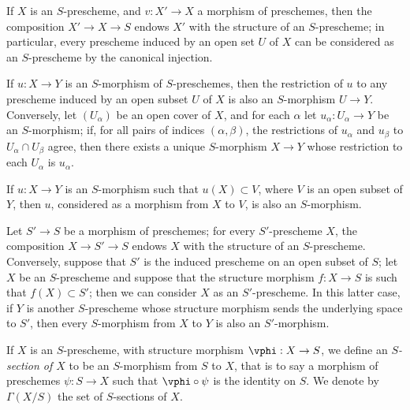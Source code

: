 \begin{env}[2.5.3]
\label{I.2.5.3}
If $X$ is an $S$-prescheme, and $v:X'\to X$ a morphism of preschemes, then the composition $X'\to X\to S$ endows $X'$ with the structure of an $S$-prescheme;
in particular, every prescheme induced by an open set $U$ of $X$ can be considered as an $S$-prescheme by the canonical injection.

If $u:X\to Y$ is an $S$-morphism of $S$-preschemes, then the restriction of $u$ to any prescheme induced by an open subset $U$ of $X$ is also an $S$-morphism $U\to Y$.
Conversely, let $(U_\alpha)$ be an open cover of $X$, and for each $\alpha$ let $u_\alpha:U_\alpha\to Y$ be an $S$-morphism;
if, for all pairs of indices $(\alpha,\beta)$, the restrictions of $u_\alpha$ and $u_\beta$ to $U_\alpha\cap U_\beta$ agree, then there exists a unique $S$-morphism $X\to Y$ whose restriction to each $U_\alpha$ is $u_\alpha$.

If $u:X\to Y$ is an $S$-morphism such that $u(X)\subset V$, where $V$ is an open subset of $Y$, then $u$, considered as a morphism from $X$ to $V$, is also an $S$-morphism.
\end{env}

\begin{env}[2.5.4]
\label{I.2.5.4}
Let $S'\to S$ be a morphism of preschemes;
for every $S'$-prescheme $X$, the composition $X\to S'\to S$ endows $X$ with the structure of an $S$-prescheme.
Conversely, suppose that $S'$ is the induced prescheme on an open subset of $S$;
let $X$ be an $S$-prescheme and suppose that the structure morphism $f:X\to S$ is such that $f(X)\subset S'$;
then we can consider $X$ as an $S'$-prescheme.
In this latter case, if $Y$ is another $S$-prescheme whose structure morphism sends the underlying space to $S'$, then every $S$-morphism from $X$ to $Y$ is also an $S'$-morphism.
\end{env}

\begin{env}[2.5.5]
\label{I.2.5.5}
If $X$ is an $S$-prescheme, with structure morphism $\vphi:X\to S$, we define an \emph{$S$-section of $X$} to be an $S$-morphism from $S$ to $X$, that is to say a morphism of preschemes $\psi:S\to X$ such that $\vphi\circ\psi$ is the identity on $S$.
We denote by $\Gamma(X/S)$ the set of $S$-sections of $X$.
\end{env}
